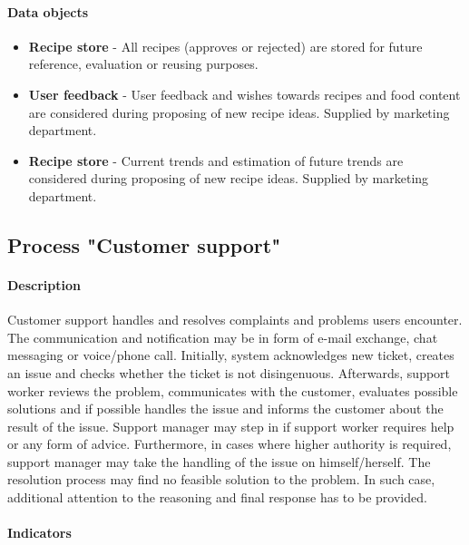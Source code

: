 \documentclass[11pt,a4paper]{article}
\begin{document}
\paragraph{Data objects}

\begin{itemize}
    \item \textbf{Recipe store} - All recipes (approves or rejected) are stored for future reference, evaluation or reusing purposes.
    \item \textbf{User feedback} - User feedback and wishes towards recipes and food content are considered during proposing of new recipe ideas. Supplied by marketing department.
    \item \textbf{Recipe store} - Current trends and estimation of future trends are considered during proposing of new recipe ideas. Supplied by marketing department.
\end{itemize}

\newpage




\subsection{Process "Customer support"}

\paragraph{Description}
Customer support handles and resolves complaints and problems users encounter. The communication and notification may be in form of e-mail exchange, chat messaging or voice/phone call. Initially, system acknowledges new ticket, creates an issue and checks whether the ticket is not disingenuous. Afterwards, support worker reviews the problem, communicates with the customer, evaluates possible solutions and if possible handles the issue and informs the customer about the result of the issue. Support manager may step in if support worker requires help or any form of advice. Furthermore, in cases where higher authority is required, support manager may take the handling of the issue on himself/herself. The resolution process may find no feasible solution to the problem. In such case, additional attention to the reasoning and final response has to be provided.

\paragraph{Indicators}
\end{document}
